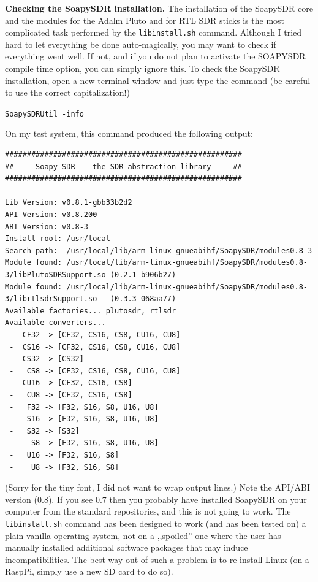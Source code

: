 \documentclass[12pt]{book}
\def\grtt#1{\texttt{\color{magenta}#1}}
\begin{document}
\textbf{Checking the SoapySDR installation.}
The installation of the SoapySDR core and the modules for the Adalm Pluto and for RTL SDR
sticks is the most complicated task performed by the \texttt{libinstall.sh} command.
Although I tried hard to let everything be done auto-magically, you may want to check
if everything went well. If not, and if you do not plan to activate the SOAPYSDR compile time
option, you can simply ignore this. To check the SoapySDR installation, open a new terminal
window and just type the command (be careful to use the correct capitalization!)

\grtt{SoapySDRUtil -info}

On my test system, this command produced the following output:
\begin{tiny}
\begin{verbatim}
######################################################
##     Soapy SDR -- the SDR abstraction library     ##
######################################################

Lib Version: v0.8.1-gbb33b2d2
API Version: v0.8.200
ABI Version: v0.8-3
Install root: /usr/local
Search path:  /usr/local/lib/arm-linux-gnueabihf/SoapySDR/modules0.8-3
Module found: /usr/local/lib/arm-linux-gnueabihf/SoapySDR/modules0.8-3/libPlutoSDRSupport.so (0.2.1-b906b27)
Module found: /usr/local/lib/arm-linux-gnueabihf/SoapySDR/modules0.8-3/librtlsdrSupport.so   (0.3.3-068aa77)
Available factories... plutosdr, rtlsdr
Available converters...
 -  CF32 -> [CF32, CS16, CS8, CU16, CU8]
 -  CS16 -> [CF32, CS16, CS8, CU16, CU8]
 -  CS32 -> [CS32]
 -   CS8 -> [CF32, CS16, CS8, CU16, CU8]
 -  CU16 -> [CF32, CS16, CS8]
 -   CU8 -> [CF32, CS16, CS8]
 -   F32 -> [F32, S16, S8, U16, U8]
 -   S16 -> [F32, S16, S8, U16, U8]
 -   S32 -> [S32]
 -    S8 -> [F32, S16, S8, U16, U8]
 -   U16 -> [F32, S16, S8]
 -    U8 -> [F32, S16, S8]
\end{verbatim}
\end{tiny}

(Sorry for the tiny font, I did not want to wrap output lines.)
Note the API/ABI version (0.8). If you see 0.7 then you probably have installed SoapySDR on your computer 
from
the standard repositories, and this is not going to work. The \texttt{libinstall.sh} command  has been 
designed 
to work (and has been tested on) a plain vanilla operating system, not on a ,,spoiled'' one
where the user has manually installed additional software packages that may induce incompatibilities.
The best way out of such a problem is to re-install Linux (on a RaspPi, simply use a new SD card to do so).
\end{document}

